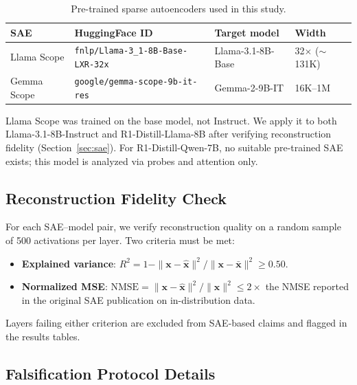 \begin{table}[h]
\centering
\caption{Pre-trained sparse autoencoders used in this study.}
\label{tab:sae_sources}
\vspace{4pt}
\small
\begin{tabular}{llll}
\toprule
\textbf{SAE} & \textbf{HuggingFace ID} & \textbf{Target model} & \textbf{Width} \\
\midrule
Llama Scope & \texttt{fnlp/Llama-3\_1-8B-Base-LXR-32x} & Llama-3.1-8B-Base & 32$\times$ ($\sim$131K) \\
Gemma Scope & \texttt{google/gemma-scope-9b-it-res} & Gemma-2-9B-IT & 16K--1M \\
\bottomrule
\end{tabular}
\vspace{2pt}
\raggedright
\footnotesize{Llama Scope was trained on the base model, not Instruct.
We apply it to both Llama-3.1-8B-Instruct and R1-Distill-Llama-8B after
verifying reconstruction fidelity (Section~\ref{sec:sae}).  For
R1-Distill-Qwen-7B, no suitable pre-trained SAE exists; this model is
analyzed via probes and attention only.}
\end{table}

\subsection{Reconstruction Fidelity Check}

For each SAE--model pair, we verify reconstruction quality on a random
sample of 500 activations per layer.  Two criteria must be met:
\begin{itemize}[leftmargin=*,itemsep=1pt]
  \item \textbf{Explained variance}: $R^2 = 1 - \|\mathbf{x} -
  \hat{\mathbf{x}}\|^2 / \|\mathbf{x} - \bar{\mathbf{x}}\|^2 \geq 0.50$.
  \item \textbf{Normalized MSE}: $\text{NMSE} = \|\mathbf{x} -
  \hat{\mathbf{x}}\|^2 / \|\mathbf{x}\|^2 \leq 2\times$ the NMSE
  reported in the original SAE publication on in-distribution data.
\end{itemize}
Layers failing either criterion are excluded from SAE-based claims and
flagged in the results tables.

\subsection{Falsification Protocol Details}


